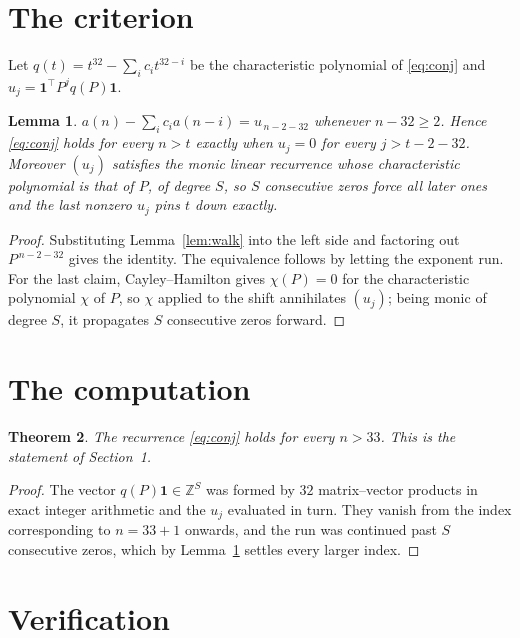 \documentclass[11pt,a4paper]{article}
\theoremstyle{plain}
\newtheorem{theorem}{Theorem}
\newtheorem{lemma}[theorem]{Lemma}
\theoremstyle{definition}
\begin{document}
\section{The criterion}

Let $q(t)=t^{32}-\sum_i c_i t^{32-i}$ be the characteristic polynomial of
\eqref{eq:conj} and $u_j=\mathbf{1}^{\!\top}P^{j}q(P)\mathbf{1}$.

\begin{lemma}\label{lem:crit}
$a(n)-\sum_i c_i a(n-i)=u_{\,n-2-32}$ whenever $n-32\ge2$. Hence
\eqref{eq:conj} holds for every $n>t$ exactly when $u_j=0$ for every
$j>t-2-32$. Moreover $(u_j)$ satisfies the monic linear recurrence whose
characteristic polynomial is that of $P$, of degree $S$, so $S$ consecutive zeros force all
later ones and the last nonzero $u_j$ pins $t$ down exactly.
\end{lemma}

\begin{proof}
Substituting Lemma~\ref{lem:walk} into the left side and factoring out
$P^{\,n-2-32}$ gives the identity. The equivalence follows by letting the exponent
run. For the last claim, Cayley--Hamilton gives $\chi(P)=0$ for the characteristic
polynomial $\chi$ of $P$, so $\chi$ applied to the shift annihilates $(u_j)$; being monic of
degree $S$, it propagates $S$ consecutive zeros forward.
\end{proof}

\section{The computation}

\begin{theorem}
The recurrence \eqref{eq:conj} holds for every $n>33$. This is the statement of
Section~1.
\end{theorem}

\begin{proof}
The vector $q(P)\mathbf{1}\in\mathbb{Z}^{S}$ was formed by $32$ matrix--vector
products in exact integer arithmetic and the $u_j$ evaluated in turn. They vanish from the
index corresponding to $n=33+1$ onwards, and the run was continued past $S$ consecutive
zeros, which by Lemma~\ref{lem:crit} settles every larger index.
\end{proof}

\section{Verification}
\end{document}
